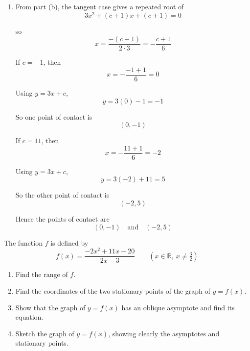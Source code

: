 \documentclass[leqno]{article}
\begin{document}
\begin{enumerate}[
  label=\textbf{\arabic*.},
  leftmargin=*,
  topsep=0pt,
  partopsep=0pt,
  parsep=0pt
]
\begin{djsSolution}
\begin{enumerate}[label=\textbf{(\alph*)}]
\begin{enumerate}[label=(\roman*)]
    Therefore its discriminant is zero:
    \[
    (c+1)^2-4(3)(c+1)=0
    \]

    So
    \begin{align*}
    (c+1)^2-12(c+1)&=0 \\
    (c+1)\bigl((c+1)-12\bigr)&=0 \\
    (c+1)(c-11)&=0
    \end{align*}

    Hence
    \[
    c=-1 \quad \text{or} \quad c=11
    \]

    \item From part (b), the tangent case gives a repeated root of
    \[
    3x^2+(c+1)x+(c+1)=0
    \]

    so
    \[
    x=\frac{-(c+1)}{2\cdot 3}=-\frac{c+1}{6}
    \]

    If $c=-1$, then
    \[
    x=-\frac{-1+1}{6}=0
    \]

    Using $y=3x+c$,
    \[
    y=3(0)-1=-1
    \]

    So one point of contact is
    \[
    (0,-1)
    \]

    If $c=11$, then
    \[
    x=-\frac{11+1}{6}=-2
    \]

    Using $y=3x+c$,
    \[
    y=3(-2)+11=5
    \]

    So the other point of contact is
    \[
    (-2,5)
    \]

    Hence the points of contact are
    \[
    (0,-1) \quad \text{and} \quad (-2,5)
    \]
  \end{enumerate}
\end{enumerate}
\end{djsSolution}


\newpage

\questionitem

The function $f$ is defined by
\[
f(x)=\frac{-2x^2+11x-20}{2x-3} \qquad (x \in \mathbb{R},\ x \ne \tfrac{3}{2})
\]
\begin{enumerate}[label=\textbf{(\alph*)}]
  \item Find the range of $f$.  \\
  \item Find the coordinates of the two stationary points of the graph of $y=f(x)$.  \\
  \item Show that the graph of $y=f(x)$ has an oblique asymptote and find its equation.  \\
  \item Sketch the graph of $y=f(x)$, showing clearly the asymptotes and stationary points.  \\
\end{enumerate}


\end{enumerate}
\end{document}
